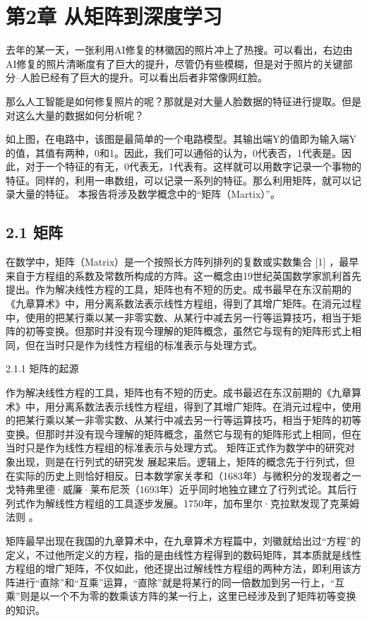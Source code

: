 \section{第2章  从矩阵到深度学习}

去年的某一天，一张利用AI修复的林徽因的照片冲上了热搜。可以看出，右边由AI修复的照片清晰度有了巨大的提升，尽管仍有些模糊，但是对于照片的关键部分--人脸已经有了巨大的提升。可以看出后者非常像网红脸。

那么人工智能是如何修复照片的呢？那就是对大量人脸数据的特征进行提取。但是对这么大量的数据如何分析呢？

如上图，在电路中，该图是最简单的一个电路模型。其输出端Y的值即为输入端Y的值，其值有两种，0和1。因此，我们可以通俗的认为，0代表否，1代表是。因此，对于一个特征的有无，0代表无，1代表有。这样就可以用数字记录一个事物的特征。同样的，利用一串数组，可以记录一系列的特征。那么利用矩阵，就可以记录大量的特征。
本报告将涉及数学概念中的“矩阵（Martix）”。

\subsection{2.1 矩阵}

在数学中，矩阵（Matrix）是一个按照长方阵列排列的复数或实数集合 [1]  ，最早来自于方程组的系数及常数所构成的方阵。这一概念由19世纪英国数学家凯利首先提出。作为解决线性方程的工具，矩阵也有不短的历史。成书最早在东汉前期的《九章算术》中，用分离系数法表示线性方程组，得到了其增广矩阵。在消元过程中，使用的把某行乘以某一非零实数、从某行中减去另一行等运算技巧，相当于矩阵的初等变换。但那时并没有现今理解的矩阵概念，虽然它与现有的矩阵形式上相同，但在当时只是作为线性方程组的标准表示与处理方式。

{2.1.1 矩阵的起源}

作为解决线性方程的工具，矩阵也有不短的历史。成书最迟在东汉前期的《九章算术》中，用分离系数法表示线性方程组，得到了其增广矩阵。在消元过程中，使用的把某行乘以某一非零实数、从某行中减去另一行等运算技巧，相当于矩阵的初等变换。但那时并没有现今理解的矩阵概念，虽然它与现有的矩阵形式上相同，但在当时只是作为线性方程组的标准表示与处理方式。
矩阵正式作为数学中的研究对象出现，则是在行列式的研究发 展起来后。逻辑上，矩阵的概念先于行列式，但在实际的历史上则恰好相反。日本数学家关孝和（1683年）与微积分的发现者之一戈特弗里德·威廉·莱布尼茨（1693年）近乎同时地独立建立了行列式论。其后行列式作为解线性方程组的工具逐步发展。1750年，加布里尔·克拉默发现了克莱姆法则 。

	矩阵最早出现在我国的九章算术中，在九章算术方程篇中，刘徽就给出过“方程”的定义，不过他所定义的方程，指的是由线性方程得到的数码矩阵，其本质就是线性方程组的增广矩阵，不仅如此，他还提出过解线性方程组的两种方法，即利用该方阵进行“直除”和“互乘”运算，“直除”就是将某行的同一倍数加到另一行上，“互乘”则是以一个不为零的数乘该方阵的某一行上，这里已经涉及到了矩阵初等变换的知识。
	
